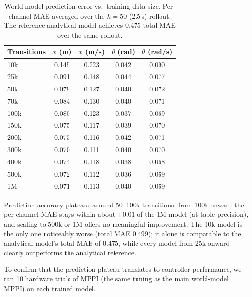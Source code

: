 \begin{table}[!t]
\centering
\caption{World model prediction error vs.\ training data size.
  Per-channel MAE averaged over the $h=50$ (2.5\,s) rollout.
  The reference analytical model achieves 0.475 total MAE over the same
  rollout.}
\label{tab:wm_data_sweep}
\begin{tabular}{lcccc}
\toprule
\textbf{Transitions} & $x$ (m) & $\dot{x}$ (m/s) & $\theta$ (rad) & $\dot{\theta}$ (rad/s) \\
\midrule
10k  & 0.145 & 0.223 & 0.042 & 0.090 \\
25k  & 0.091 & 0.148 & 0.044 & 0.077 \\
50k  & 0.079 & 0.127 & 0.040 & 0.072 \\
70k  & 0.084 & 0.130 & 0.040 & 0.071 \\
100k & 0.080 & 0.123 & 0.037 & 0.069 \\
150k & 0.075 & 0.117 & 0.039 & 0.070 \\
200k & 0.073 & 0.116 & 0.042 & 0.071 \\
300k & 0.070 & 0.111 & 0.040 & 0.070 \\
400k & 0.074 & 0.118 & 0.038 & 0.068 \\
500k & 0.072 & 0.112 & 0.036 & 0.069 \\
1M   & 0.071 & 0.113 & 0.040 & 0.069 \\
\bottomrule
\end{tabular}
\end{table}

Prediction accuracy plateaus around 50--100k transitions: from 100k
onward the per-channel MAE stays within about $\pm0.01$ of the 1M model
(at table precision), and
scaling to 500k or 1M offers no meaningful improvement.  The 10k model
is the only one noticeably worse (total MAE 0.499); it alone is
comparable to the analytical model's total MAE of 0.475, while every
model from 25k onward clearly outperforms the analytical reference.

To confirm that the prediction plateau translates to controller
performance, we ran 10 hardware trials of MPPI (the same tuning as the
main world-model MPPI) on each trained model.

